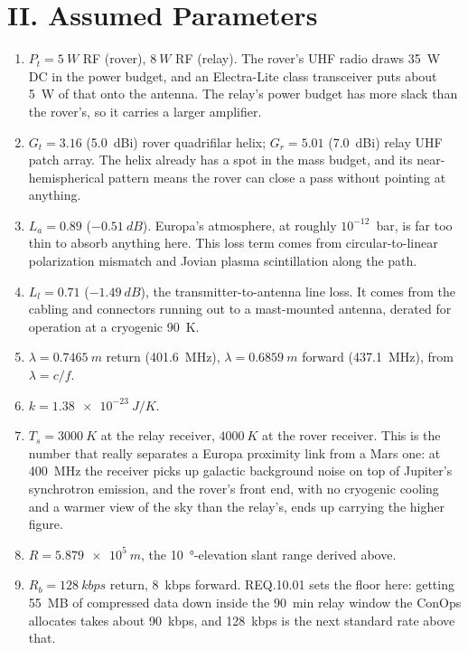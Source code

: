 \documentclass[11pt]{article}
\begin{document}
\section*{II. Assumed Parameters}

\begin{enumerate}[label=\alph*., leftmargin=*]
    \item $P_t = \SI{5}{W}$ RF (rover), $\SI{8}{W}$ RF (relay). The rover's UHF radio draws
    \SI{35}{W} DC in the power budget, and an Electra-Lite class transceiver puts about
    \SI{5}{W} of that onto the antenna. The relay's power budget has more slack than the rover's,
    so it carries a larger amplifier.

    \item $G_t = 3.16$ (\SI{5.0}{dBi}) rover quadrifilar helix; $G_r = 5.01$ (\SI{7.0}{dBi}) relay
    UHF patch array. The helix already has a spot in the mass budget, and its near-hemispherical
    pattern means the rover can close a pass without pointing at anything.

    \item $L_a = 0.89$ ($\SI{-0.51}{dB}$). Europa's atmosphere, at roughly $10^{-12}$~bar, is far
    too thin to absorb anything here. This loss term comes from circular-to-linear polarization
    mismatch and Jovian plasma scintillation along the path.

    \item $L_l = 0.71$ ($\SI{-1.49}{dB}$), the transmitter-to-antenna line loss. It comes from the
    cabling and connectors running out to a mast-mounted antenna, derated for operation at a
    cryogenic \SI{90}{K}.

    \item $\lambda = \SI{0.7465}{m}$ return (\SI{401.6}{MHz}), $\lambda = \SI{0.6859}{m}$ forward
    (\SI{437.1}{MHz}), from $\lambda = c/f$.

    \item $k = \SI{1.38e-23}{J/K}$.

    \item $T_s = \SI{3000}{K}$ at the relay receiver, $\SI{4000}{K}$ at the rover receiver. This is
    the number that really separates a Europa proximity link from a Mars one: at \SI{400}{MHz} the
    receiver picks up galactic background noise on top of Jupiter's synchrotron emission, and the
    rover's front end, with no cryogenic cooling and a warmer view of the sky than the relay's,
    ends up carrying the higher figure.

    \item $R = \SI{5.879e5}{m}$, the \SI{10}{\degree}-elevation slant range derived above.

    \item $R_b = \SI{128}{kbps}$ return, \SI{8}{kbps} forward. REQ.10.01 sets the floor here:
    getting \SI{55}{MB} of compressed data down inside the \SI{90}{min} relay window the ConOps
    allocates takes about \SI{90}{kbps}, and \SI{128}{kbps} is the next standard rate above that.
\end{enumerate}
\end{document}
